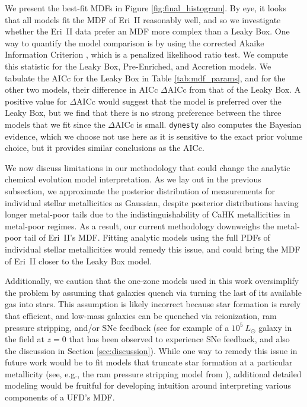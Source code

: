 \documentclass[twocolumn]{aastex63}
\begin{document}
\par We present the best-fit MDFs in Figure \ref{fig:final_histogram}. By eye, it looks that all models fit the MDF of Eri~II reasonably well, and so we investigate whether the Eri~II data prefer an MDF more complex than a Leaky Box. One way to quantify the model comparison is by using the corrected Akaike Information Criterion \citep[AICc][]{kirby2011MDFs}, which is a penalized likelihood ratio test. We compute this statistic for the Leaky Box, Pre-Enriched, and Accretion models. We tabulate the AICc for the Leaky Box in Table \ref{tab:mdf_params}, and for the other two models, their difference in AICc $\Delta \mbox{AICc}$ from that of the Leaky Box. A positive value for $\Delta \mbox{AICc}$ would suggest that the model is preferred over the Leaky Box, but we find that there is no strong preference between the three models that we fit since the $\Delta \mbox{AICc}$ is small. \texttt{dynesty} also computes the Bayesian evidence, which we choose not use here as it is sensitive to the exact prior volume choice, but it provides similar conclusions as the AICc. 

\par We now discuss limitations in our methodology that could change the analytic chemical evolution model interpretation. As we lay out in the previous subsection, we approximate the posterior distribution of measurements for individual stellar metallicities as Gaussian, despite posterior distributions having longer metal-poor tails due to the indistinguishability of CaHK metallicities in metal-poor regimes. As a result, our current methodology downweighs the metal-poor tail of Eri~II's MDF. Fitting analytic models using the full PDFs of individual stellar metallicities would remedy this issue, and could bring the MDF of Eri~II closer to the Leaky Box model.

\par Additionally, we caution that the one-zone models used in this work oversimplify the problem by assuming that galaxies quench via turning the last of its available gas into stars. This assumption is likely incorrect because star formation is rarely that efficient, and low-mass galaxies can be quenched via reionization, ram pressure stripping, and/or SNe feedback (see \citealt{eggen2021} for example of a $10^5~L_{\odot}$ galaxy in the field at $z=0$ that has been observed to experience SNe feedback, and also the discussion in Section \ref{sec:discussion}). While one way to remedy this issue in future work would be to fit models that truncate star formation at a particular metallicity (see, e.g., the ram pressure stripping model from \citealt{kirby2013LZR}), additional detailed modeling would be fruitful for developing intuition around interpreting various components of a UFD's MDF.
\end{document}
